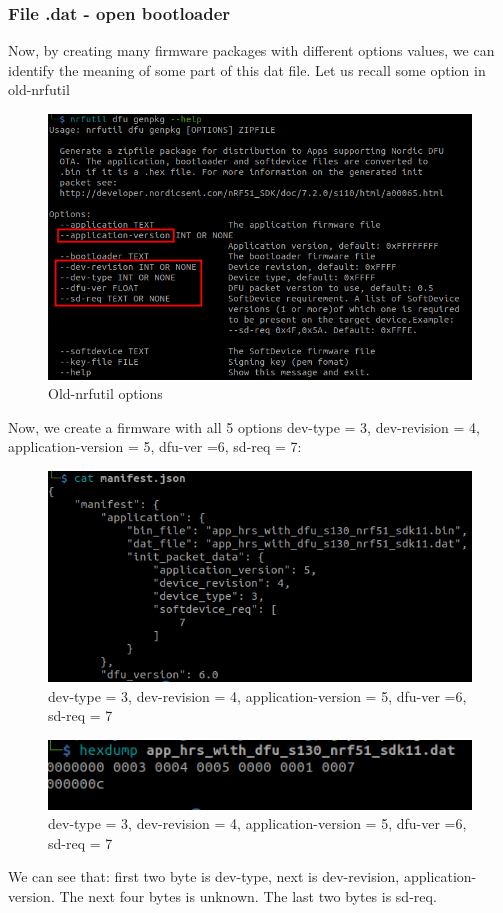 \documentclass{article}
\theoremstyle{plain}
\theoremstyle{definition}
\numberwithin{equation}{section}
\begin{document}
\subsubsection{File .dat - open bootloader}\label{dat file open}
Now, by creating many firmware packages with different options values, we can identify the meaning of some part of this dat file. Let us recall some option in old-nrfutil
\begin{figure}[H]
	\centering
	\includegraphics[width=0.7\linewidth]{images/old-nrfutil-options}
	\caption{Old-nrfutil options}
	\label{fig:old-nrfutil-options}
\end{figure}
Now, we create a firmware with all 5 options dev-type = 3, dev-revision = 4, application-version = 5, dfu-ver =6, sd-req = 7:
\begin{figure}[H]
	\centering
	\includegraphics[width=0.7\linewidth]{images/dfu_type3revision4app5dfuver6sdreq7}
	\caption{dev-type = 3, dev-revision = 4, application-version = 5, dfu-ver =6, sd-req = 7}
	\label{fig:dfutype3revision4app5dfuver6sdreq7}
\end{figure}
\begin{figure}[H]
	\centering
	\includegraphics[width=0.7\linewidth]{images/dfu_type3revision4app5dfuver6sdreq7-dat}
	\caption{dev-type = 3, dev-revision = 4, application-version = 5, dfu-ver =6, sd-req = 7}
	\label{fig:dfutype3revision4app5dfuver6sdreq7-dat}
\end{figure}
We can see that: first two byte is dev-type, next is dev-revision, application-version. The next four bytes is unknown. The last two bytes is sd-req.
\end{document}
